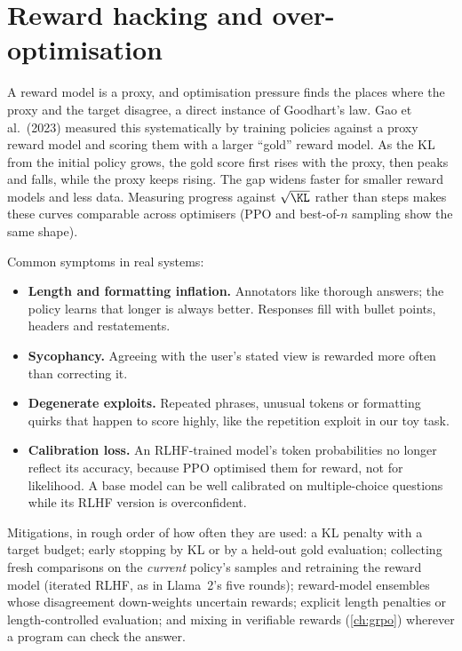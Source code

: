 \section{Reward hacking and over-optimisation}\label{sec:rlhf:overopt}

A reward model is a proxy, and optimisation pressure finds the places where the proxy and the
target disagree, a direct instance of Goodhart's law. Gao et al.\ (2023) measured this systematically
by training policies against a proxy reward model and scoring them with a larger ``gold'' reward model. As the KL
from the initial policy grows, the gold score first rises with the proxy, then peaks and falls,
while the proxy keeps rising. The gap widens faster for smaller reward models and less data.
Measuring progress against $\sqrt{\KL}$ rather than steps makes these curves comparable across
optimisers (PPO and best-of-$n$ sampling show the same shape).

Common symptoms in real systems:
\begin{itemize}
  \item \textbf{Length and formatting inflation.} Annotators like thorough answers; the policy learns
        that longer is always better. Responses fill with bullet points, headers and restatements.
  \item \textbf{Sycophancy.} Agreeing with the user's stated view is rewarded more often than
        correcting it.
  \item \textbf{Degenerate exploits.} Repeated phrases, unusual tokens or formatting quirks that
        happen to score highly, like the repetition exploit in our toy task.
  \item \textbf{Calibration loss.} An RLHF-trained model's token probabilities no longer reflect its
        accuracy, because PPO optimised them for reward, not for likelihood. A base model can be well
        calibrated on multiple-choice questions while its RLHF version is overconfident.
\end{itemize}

Mitigations, in rough order of how often they are used: a KL penalty with a target budget; early
stopping by KL or by a held-out gold evaluation; collecting fresh comparisons on the \emph{current}
policy's samples and retraining the reward model (iterated RLHF, as in Llama~2's five rounds); reward-model ensembles
whose disagreement down-weights uncertain rewards; explicit length penalties or length-controlled
evaluation; and mixing in verifiable rewards (\cref{ch:grpo}) wherever a program can check the
answer.

